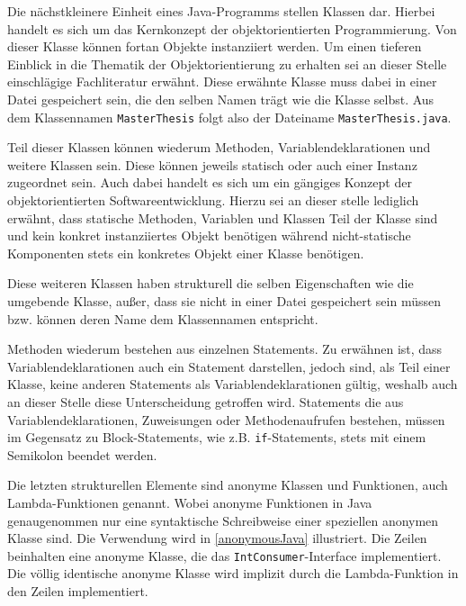 Die nächstkleinere Einheit eines Java-Programms stellen Klassen dar. Hierbei handelt es sich um das Kernkonzept der objektorientierten Programmierung. Von dieser Klasse können fortan Objekte instanziiert werden. Um einen tieferen Einblick in die Thematik der Objektorientierung zu erhalten sei an dieser Stelle einschlägige Fachliteratur erwähnt. Diese erwähnte Klasse muss dabei in einer Datei gespeichert sein, die den selben Namen trägt wie die Klasse selbst. Aus dem Klassennamen \texttt{MasterThesis} folgt also der Dateiname \texttt{MasterThesis.java}.

Teil dieser Klassen können wiederum Methoden, Variablendeklarationen und weitere Klassen sein. Diese können jeweils statisch oder auch einer Instanz zugeordnet sein. Auch dabei handelt es sich um ein gängiges Konzept der objektorientierten Softwareentwicklung. Hierzu sei an dieser stelle lediglich erwähnt, dass statische Methoden, Variablen und Klassen Teil der Klasse sind und kein konkret instanziiertes Objekt benötigen während nicht-statische Komponenten stets ein konkretes Objekt einer Klasse benötigen.

Diese weiteren Klassen haben strukturell die selben Eigenschaften wie die umgebende Klasse, außer, dass sie nicht in einer Datei gespeichert sein müssen bzw. können deren Name dem Klassennamen entspricht.


Methoden wiederum bestehen aus einzelnen Statements. Zu erwähnen ist, dass Variablendeklarationen auch ein Statement darstellen, jedoch sind, als Teil einer Klasse, keine anderen Statements als Variablendeklarationen gültig, weshalb auch an dieser Stelle diese Unterscheidung getroffen wird. Statements die aus Variablendeklarationen, Zuweisungen oder Methodenaufrufen bestehen, müssen im Gegensatz zu Block-Statements, wie z.B. \texttt{if}-Statements, stets mit einem Semikolon beendet werden. 

Die letzten strukturellen Elemente sind anonyme Klassen und Funktionen, auch Lambda-Funktionen genannt. Wobei anonyme Funktionen in Java genaugenommen nur eine syntaktische Schreibweise einer speziellen anonymen Klasse sind. Die Verwendung wird in \autoref{anonymousJava} illustriert. Die Zeilen  beinhalten eine anonyme Klasse, die das \texttt{IntConsumer}-Interface implementiert. Die völlig identische  anonyme Klasse wird implizit durch die Lambda-Funktion in den Zeilen  implementiert.

